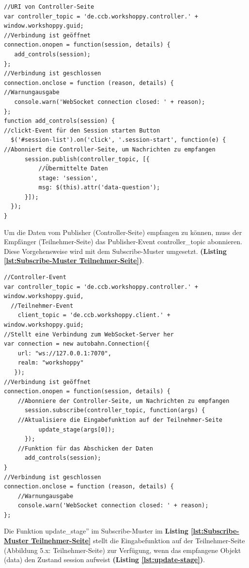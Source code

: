 \newpage
\begin{lstlisting}[caption={Publish-Muster auf der Controller-Seite - JavaScript}, label=lst:Publish-Muster Controller-Seite, captionpos=b]
//URI von Controller-Seite
var controller_topic = 'de.ccb.workshoppy.controller.' + window.workshoppy.guid;
//Verbindung ist geöffnet
connection.onopen = function(session, details) {
   add_controls(session);
};
//Verbindung ist geschlossen
connection.onclose = function (reason, details) {
//Warnungausgabe
   console.warn('WebSocket connection closed: ' + reason);
};
function add_controls(session) {
//clickt-Event für den Session starten Button
  $('#session-list').on('click', '.session-start', function(e) {
//Abonniert die Controller-Seite, um Nachrichten zu empfangen
      session.publish(controller_topic, [{
     	  //Übermittelte Daten
          stage: 'session',
          msg: $(this).attr('data-question');
      }]);
  });
}
\end{lstlisting}

\newpage
Um die Daten vom Publisher (Controller-Seite) empfangen zu können, muss der Empfänger (Teilnehmer-Seite) das Publisher-Event \glqq controller\_topic\grqq{} abonnieren. Diese Vorgehensweise wird mit dem Subscribe-Muster umgesetzt. \textbf{(Listing \ref{lst:Subscribe-Muster Teilnehmer-Seite})}.\bigskip

\begin{lstlisting}[caption={Subscribe-Muster auf der Teilnehmer-Seite - JavaScript}, label=lst:Subscribe-Muster Teilnehmer-Seite, captionpos=b]
//Controller-Event
var controller_topic = 'de.ccb.workshoppy.controller.' + window.workshoppy.guid,
  //Teilnehmer-Event
    client_topic = 'de.ccb.workshoppy.client.' + window.workshoppy.guid;
//Stellt eine Verbindung zum WebSocket-Server her
var connection = new autobahn.Connection({
    url: "ws://127.0.0.1:7070",
    realm: "workshoppy"
   });
//Verbindung ist geöffnet
connection.onopen = function(session, details) {
	//Abonniere der Controller-Seite, um Nachrichten zu empfangen
      session.subscribe(controller_topic, function(args) {
	//Aktualisiere die Eingabefunktion auf der Teilnehmer-Seite
          update_stage(args[0]);
      });
	//Funktion für das Abschicken der Daten
      add_controls(session);
}
//Verbindung ist geschlossen
connection.onclose = function (reason, details) {
	//Warnungausgabe
	console.warn('WebSocket connection closed: ' + reason);
};
\end{lstlisting}

\newpage
Die Funktion \glqq update\_stage\grqq{}” im Subscribe-Muster im \textbf{Listing \ref{lst:Subscribe-Muster Teilnehmer-Seite}} stellt die Eingabefunktion auf der Teilnehmer-Seite (Abbildung 5.x: Teilnehmer-Seite) zur Verfügung, wenn das empfangene Objekt (data) den Zustand \glqq session\grqq{} aufweist \textbf{(Listing \ref{lst:update-stage})}.

